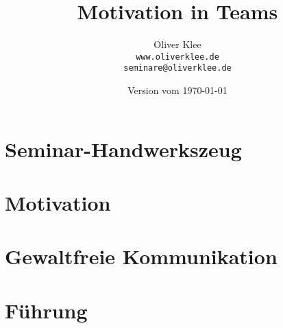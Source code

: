 \documentclass[a4paper,openany,twoside,titlepage,10pt,headsepline]{scrbook}
\title{Motivation in Teams}
\author{Oliver Klee\\\texttt{www.oliverklee.de}\\\texttt{seminare@oliverklee.de}}
\date{Version vom \today}
\begin{document}
\frontmatter

\maketitle

\tableofcontents


\mainmatter

\chapter{Seminar-Handwerkszeug}





\chapter{Motivation}




\chapter{Gewaltfreie Kommunikation}



\chapter{Führung}






\backmatter





\printindex
\end{document}
